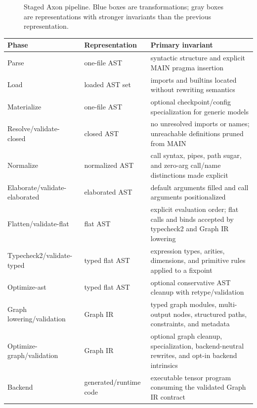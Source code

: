 \documentclass{article}
\begin{document}
\begin{figure}[t]
\caption{Staged Axon pipeline.  Blue boxes are transformations; gray boxes are
representations with stronger invariants than the previous representation.}
\label{fig:pipeline-tikz}
\end{figure}

\begin{center}
\begin{tabular}{lll}
\toprule
Phase & Representation & Primary invariant \\
\midrule
Parse & one-file AST & syntactic structure and explicit MAIN pragma insertion \\
Load & loaded AST set & imports and builtins located without rewriting semantics \\
Materialize & one-file AST & optional checkpoint/config specialization for generic models \\
Resolve/validate-closed & closed AST & no unresolved imports or names; unreachable definitions pruned from MAIN \\
Normalize & normalized AST & call syntax, pipes, path sugar, and zero-arg call/name distinctions made explicit \\
Elaborate/validate-elaborated & elaborated AST & default arguments filled and call arguments positionalized \\
Flatten/validate-flat & flat AST & explicit evaluation order; flat calls and binds accepted by typecheck2 and Graph IR lowering \\
Typecheck2/validate-typed & typed flat AST & expression types, arities, dimensions, and primitive rules applied to a fixpoint \\
Optimize-ast & typed flat AST & optional conservative AST cleanup with retype/validation \\
Graph lowering/validation & Graph IR & typed graph modules, multi-output nodes, structured paths, constraints, and metadata \\
Optimize-graph/validation & Graph IR & optional graph cleanup, specialization, backend-neutral rewrites, and opt-in backend intrinsics \\
Backend & generated/runtime code & executable tensor program consuming the validated Graph IR contract \\
\bottomrule
\end{tabular}
\end{center}
\end{document}
